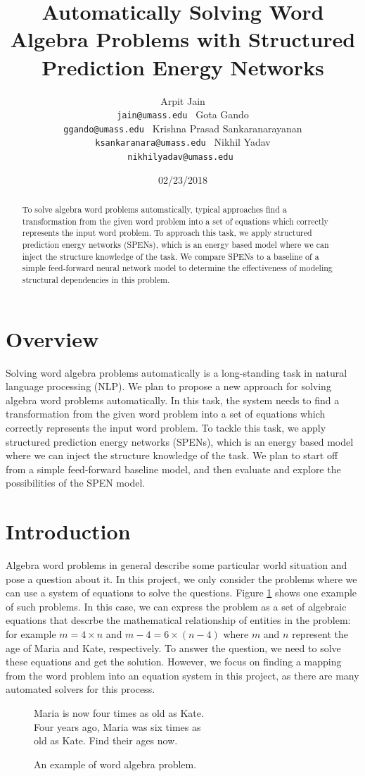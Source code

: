 \documentclass[11pt,letterpaper]{article}
\title{Automatically Solving Word Algebra Problems with Structured Prediction Energy Networks}
\author{Arpit Jain\\ {\tt jain@umass.edu }  \And Gota Gando\\ {\tt ggando@umass.edu } \AND Krishna Prasad Sankaranarayanan\\ {\tt ksankaranara@umass.edu }  \And Nikhil Yadav\\
  {\tt nikhilyadav@umass.edu }}
\date{02/23/2018}
\begin{document}
\maketitle


\section{Overview}
Solving word algebra problems automatically is a long-standing task in natural language processing (NLP). We plan to propose a new approach for solving algebra word problems automatically. In this task, the system needs to find a transformation from the given word problem into a set of equations which correctly represents the input word problem. To tackle this task, we apply structured prediction energy networks (SPENs), which is an energy based model where we can inject the structure knowledge of the task. We plan to start off from a simple feed-forward baseline model, and then evaluate and explore the possibilities of the SPEN model.
\fi

\begin{abstract}
To solve algebra word problems automatically, typical approaches find a transformation from the given word problem into a set of equations which correctly represents the input word problem. To approach this task, we apply structured prediction energy networks (SPENs), which is an energy based model where we can inject the structure knowledge of the task. We compare SPENs to a baseline of a simple feed-forward neural network model to determine the effectiveness of modeling structural dependencies in this problem.
\end{abstract}
\section{Introduction}
Algebra word problems in general describe some particular world situation and pose a question about it. In this project, we only consider the problems where we can use a system of equations to solve the questions. Figure \ref{algebra-example} shows one example of such problems. In this case, we can express the problem as a set of algebraic equations that descrbe the mathematical relationship of entities in the problem: for example $m = 4 \times n$ and $m-4 = 6 \times (n-4)$ where $m$ and $n$ represent the age of Maria and Kate, respectively. To answer the question, we need to solve these equations and get the solution. However, we focus on finding a mapping from the word problem into an equation system in this project, as there are many automated solvers for this process.
\begin{figure}[ht]
	\centering
	Maria is now four times as old as Kate.\\
Four years ago, Maria was six times as\\
old as Kate. Find their ages now.\\
	\caption{An example of word algebra problem.}
    \label{algebra-example}
\end{figure}
\end{document}
